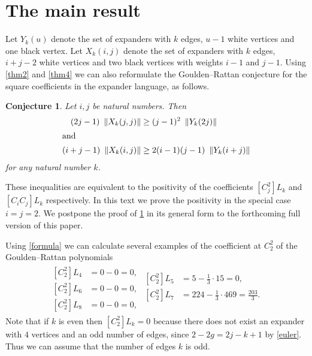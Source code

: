 \documentclass[submission]{FPSAC2021}
\newtheorem{con}{Conjecture}
\begin{document}
\pagebreak[1] 

\section{The main result} 

Let $Y_k(u)$ denote the set of expanders with $k$
edges, $u-1$ white vertices and one black vertex. 
Let $X_k(i, j)$ denote the set of expanders with $k$ edges, $i+j-2$ white
vertices and two black vertices with weights $i-1$ and $j-1$. Using  \cref{thm2}
and \cref{thm4} we can also reformulate the Goulden--Rattan conjecture
for the square coefficients in the expander language, as follows.

\begin{con} 
    \label{con:GJ2}
Let $i, j$ be natural numbers. Then 
\begin{align*}
(2j-1)\ \left\| X_k(j, j) \right\|    &   \geq (j-1)^2\ \left\| Y_k(2j) \right\| \\
\intertext{and}
(i+j-1)\ \left\| X_k(i, j) \right\|  & \geq 2(i-1)(j-1)\ \left\| Y_k(i+j) \right\|
\end{align*}
for any natural number $k$. 
\end{con}
These inequalities are equivalent to the positivity 
of the coefficients $[C_j^2] L_k$ and $[C_i C_j] L_k$ respectively.
In this text we prove the positivity in the special case $i=j=2$. 
We postpone the proof of \cref{con:GJ2} in its general form to the forthcoming full version of this paper.

Using \cref{formula} 
we can calculate several examples of the coefficient at $C_2^2$ of 
the Goulden--Rattan polynomials
\begin{align*}
\begin{split}
[C_2^2] L_4 &=0-0=0,\\
[C_2^2] L_6 &=0-0=0, \\
[C_2^2] L_8 &=0-0=0,
\end{split}
\begin{split}
[C_2^2] L_5 &=5-\frac{1}{3} \cdot 15=0,\\
[C_2^2] L_7 &=224-\frac{1}{3} \cdot 469=\frac{203}{3}.\\
\end{split}
\end{align*}
Note that if $k$ is even then $[C_2^2] L_k=0$ because there does not exist an expander with $4$ vertices and an odd number of edges, since
$2-2g=2j-k+1$ by \cref{euler}. Thus we can assume that the number of edges $k$ is odd. 
\end{document}
